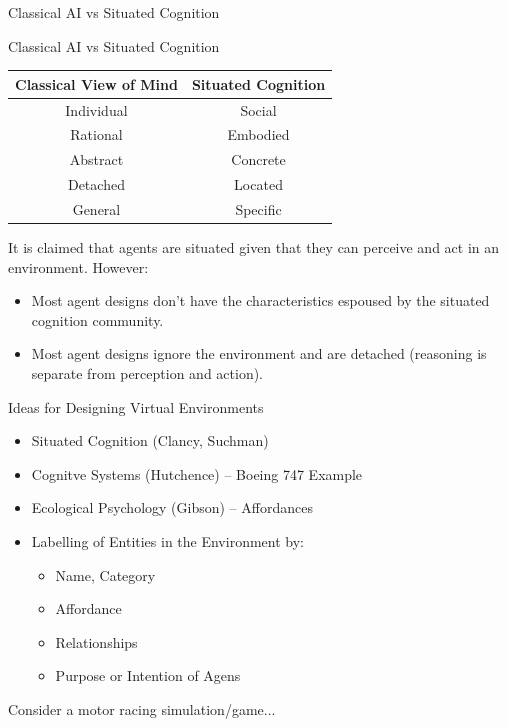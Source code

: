 \documentclass[aspectratio=1610,xcolor=dvipsnames,t]{beamer}
\begin{document}
\begin{frame}{Classical AI vs Situated Cognition}
    \begin{block}{Classical AI vs Situated Cognition}
    \begin{center}
    \begin{tabular}{cc} \hline
        \textbf{Classical View of Mind}  &   \textbf{Situated Cognition} \\ \hline
            Individual              &   Social \\
            Rational                &   Embodied \\
            Abstract                &   Concrete \\
            Detached                &   Located \\
            General                 &   Specific \\ \hline
    \end{tabular} 
    \end{center} 
    \end{block} 

    It is claimed that agents are situated given that they
    can perceive and act in an environment. However:
    \begin{itemize}
        \item Most agent designs don't have the characteristics
            espoused by the situated cognition community.
        \item Most agent designs ignore the environment and are
            detached (reasoning is separate from perception and action).
    \end{itemize}
            

\end{frame} 

\begin{frame}{Ideas for Designing Virtual Environments}
    \begin{itemize}
        \item Situated Cognition (Clancy, Suchman)
        \item Cognitve Systems (Hutchence) -- Boeing 747 Example
        \item Ecological Psychology (Gibson) -- Affordances
        \item Labelling of Entities in the Environment by:
            \begin{itemize}
                \item Name, Category
                \item Affordance
                \item Relationships
                \item Purpose or Intention of Agens
            \end{itemize}
    \end{itemize}
    
    Consider a motor racing simulation/game...
\end{frame}
\end{document}
